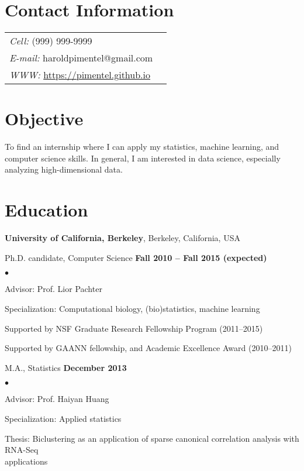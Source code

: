 \documentclass[margin,line]{res}
\newenvironment{list2}{
  \begin{list}{$\bullet$}{%
      \setlength{\itemsep}{0in}
      \setlength{\parsep}{0in} \setlength{\parskip}{0in}
      \setlength{\topsep}{0in} \setlength{\partopsep}{0in}
      \setlength{\leftmargin}{0.2in}}}{\end{list}}
\begin{document}

\begin{resume}
\section{\sc Contact Information}
\vspace{.05in}
\begin{tabular}{@{}p{4in}p{2in}}
 {\it Cell:}  (999) 999-9999 & \\
 {\it E-mail:}  haroldpimentel@gmail.com & \\
 {\it WWW:} \url{https://pimentel.github.io} &
\end{tabular}

\section{\sc Objective}
To find an internship where I can apply my statistics, machine learning, and
computer science skills. In general, I am interested in data science, especially
analyzing high-dimensional data.

\section{\sc Education}
{\bf University of California, Berkeley}, Berkeley, California, USA

\vspace{-.3cm}
Ph.D. candidate, Computer Science \hfill {\bf
  Fall 2010 -- Fall 2015 (expected) }\\
\vspace{-.45cm}
\begin{list2}
  \vspace*{1mm}
\item Advisor: Prof. Lior Pachter
\item Specialization: Computational biology, (bio)statistics, machine learning
\item Supported by NSF Graduate Research Fellowship Program (2011--2015)
\item Supported by GAANN fellowship, and Academic Excellence Award (2010--2011)
\end{list2}

M.A., Statistics \hfill {\bf
 December 2013}\\
\vspace{-.45cm}
\begin{list2}
\vspace*{1mm}
\item Advisor: Prof. Haiyan Huang
\item Specialization: Applied statistics
\item Thesis: Biclustering as an application of sparse canonical correlation analysis with RNA-Seq \\applications
\end{list2}


\end{resume}
\end{document}

